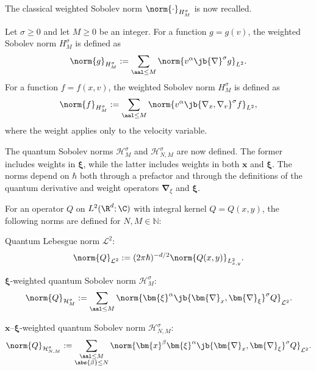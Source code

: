 The classical weighted Sobolev norm $\norm{\cdot}_{H^\sigma_M}$ is now recalled.

\begin{definition}
Let $\sigma\geq0$ and let $M\geq0$ be an integer. For a function $g=g(v)$, the weighted Sobolev norm $H^{\sigma}_M$ is defined as
\begin{align*}
\norm{g}_{H^{\sigma}_M}:=\sum_{\aal\leq M}\norm{v^\alpha\jb{\nabla}^\sigma g}_{L^2}.
\end{align*}
For a function $f=f(x,v)$, the weighted Sobolev norm $H^{\sigma}_{M}$ is defined as
\begin{align*}
\norm{f}_{H^{\sigma}_{M}}:=\sum_{\aal\leq M}\norm{v^\alpha \jb{\nabla_x,\nabla_v}^{\sigma}f}_{L^2},
\end{align*}where the weight applies only to the velocity variable.\end{definition}

The quantum Sobolev norms $\mathcal H^{\sigma}_{M}$ and $\mathcal H^{\sigma}_{N,M}$ are now defined. The former includes weights in $\bm{\xi}$, while the latter includes weights in both $\bm{x}$ and $\bm{\xi}$. The norms depend on $\hbar$ both through a prefactor and through the definitions of the quantum derivative and weight operators $\bm{\nabla}_\xi$ and $\bm{\xi}$.
\begin{definition}
For an operator $Q$ on $L^2(\R^d;\C)$ with integral kernel $Q = Q(x,y)$, the following norms are defined for $N, M \in \mathbb{N}$:
\begin{enumeratea}
\item Quantum Lebesgue norm $\mathcal{L}^2$:
\begin{align*}
\norm{Q}_{\mathcal{L}^2} := (2\pi\hbar)^{-d/2} \norm{Q(x,y)}_{L^2_{x,y}}.
\end{align*}

\item $\bm{\xi}$-weighted quantum Sobolev norm $\mathcal{H}^{\sigma}_M$:
\begin{align*}
\norm{Q}_{\mathcal{H}^{\sigma}_{M}} := \sum_{\aal \leq M} \norm{\bm{\xi}^\alpha \jb{\bm{\nabla}_x,\bm{\nabla}_\xi}^\sigma Q}_{\mathcal{L}^2}.
\end{align*}

\item $\bm{x}$–$\bm{\xi}$-weighted quantum Sobolev norm $\mathcal{H}^{\sigma}_{N,M}$:
\begin{align*}
\norm{Q}_{\mathcal{H}^{\sigma}_{N,M}} := \sum_{\substack{\aal \leq M\\ \abs{\beta} \leq N}} \norm{\bm{x}^\beta \bm{\xi}^\alpha \jb{\bm{\nabla}_x,\bm{\nabla}_\xi}^\sigma Q}_{\mathcal{L}^2}.
\end{align*}
\end{enumeratea}
\end{definition}

